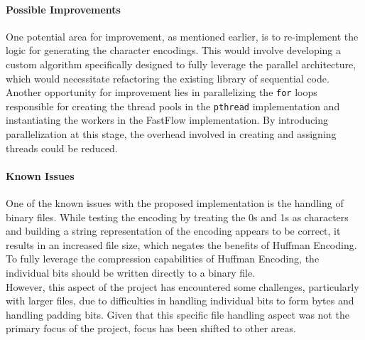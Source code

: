 \documentclass[10pt]{article}
\begin{document}
\paragraph{Possible Improvements} One potential area for improvement, as mentioned earlier, is to re-implement the logic for generating the character encodings. This would involve developing a custom algorithm specifically designed to fully leverage the parallel architecture, which would necessitate refactoring the existing library of sequential code.\\
Another opportunity for improvement lies in parallelizing the \texttt{for} loops responsible for creating the thread pools in the \texttt{pthread} implementation and instantiating the workers in the FastFlow implementation. By introducing parallelization at this stage, the overhead involved in creating and assigning threads could be reduced.
\paragraph{Known Issues} One of the known issues with the proposed implementation is the handling of binary files. While testing the encoding by treating the 0s and 1s as characters and building a string representation of the encoding appears to be correct, it results in an increased file size, which negates the benefits of Huffman Encoding. To fully leverage the compression capabilities of Huffman Encoding, the individual bits should be written directly to a binary file.\\
However, this aspect of the project has encountered some challenges, particularly with larger files, due to difficulties in handling individual bits to form bytes and handling padding bits. Given that this specific file handling aspect was not the primary focus of the project, focus has been shifted to other areas.
\end{document}
